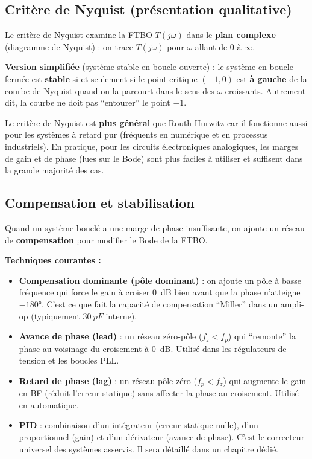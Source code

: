 \documentclass[12pt,a4paper,twoside]{book}
\begin{document}
\subsection{Critère de Nyquist (présentation qualitative)}

Le critère de Nyquist examine la FTBO $T(j\omega)$ dans le \textbf{plan complexe} (diagramme de Nyquist) : on trace $T(j\omega)$ pour $\omega$ allant de $0$ à $\infty$.

\begin{formule}
\textbf{Version simplifiée} (système stable en boucle ouverte) : le système en boucle fermée est \textbf{stable} si et seulement si le point critique $(-1, 0)$ est \textbf{à gauche} de la courbe de Nyquist quand on la parcourt dans le sens des $\omega$ croissants. Autrement dit, la courbe ne doit pas ``entourer'' le point $-1$.
\end{formule}

\begin{intuition}
Le critère de Nyquist est \textbf{plus général} que Routh-Hurwitz car il fonctionne aussi pour les systèmes à retard pur (fréquents en numérique et en processus industriels). En pratique, pour les circuits électroniques analogiques, les marges de gain et de phase (lues sur le Bode) sont plus faciles à utiliser et suffisent dans la grande majorité des cas.
\end{intuition}

\subsection{Compensation et stabilisation}

Quand un système bouclé a une marge de phase insuffisante, on ajoute un réseau de \textbf{compensation} pour modifier le Bode de la FTBO.

\begin{pratique}
\textbf{Techniques courantes :}
\begin{itemize}[nosep]
\item \textbf{Compensation dominante (pôle dominant)} : on ajoute un pôle à basse fréquence qui force le gain à croiser \SI{0}{dB} bien avant que la phase n'atteigne $-180°$. C'est ce que fait la capacité de compensation ``Miller'' dans un ampli-op (typiquement $\SI{30}{pF}$ interne).
\item \textbf{Avance de phase (lead)} : un réseau zéro-pôle ($f_z < f_p$) qui ``remonte'' la phase au voisinage du croisement à \SI{0}{dB}. Utilisé dans les régulateurs de tension et les boucles PLL.
\item \textbf{Retard de phase (lag)} : un réseau pôle-zéro ($f_p < f_z$) qui augmente le gain en BF (réduit l'erreur statique) sans affecter la phase au croisement. Utilisé en automatique.
\item \textbf{PID} : combinaison d'un intégrateur (erreur statique nulle), d'un proportionnel (gain) et d'un dérivateur (avance de phase). C'est le correcteur universel des systèmes asservis. Il sera détaillé dans un chapitre dédié.
\end{itemize}
\end{pratique}
\end{document}
